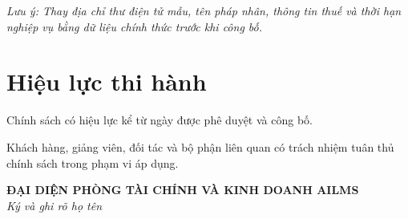 \documentclass[12pt,a4paper]{article}
\begin{document}
\textcolor{ailmsred}{
\textit{Lưu ý: Thay địa chỉ thư điện tử mẫu, tên pháp nhân,
thông tin thuế và thời hạn nghiệp vụ bằng dữ liệu chính thức
trước khi công bố.}
}

\section{Hiệu lực thi hành}

Chính sách có hiệu lực kể từ ngày được phê duyệt và công bố.

Khách hàng, giảng viên, đối tác và bộ phận liên quan
có trách nhiệm tuân thủ chính sách trong phạm vi áp dụng.

\vfill

\begin{center}
    \textbf{ĐẠI DIỆN PHÒNG TÀI CHÍNH VÀ KINH DOANH AILMS}\\[1.5cm]
    \textit{Ký và ghi rõ họ tên}
\end{center}
\end{document}
